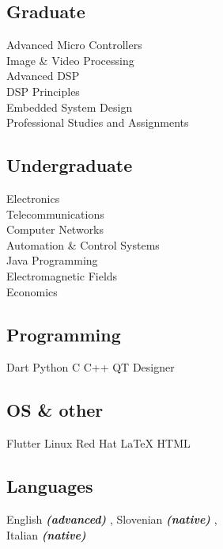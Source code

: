\documentclass[draft]{dske-resume-openfont}
\begin{document}
\begin{minipage}[t]{0.31\textwidth}
{\fontsize{\the\columnTextSize}{\the\columnLineSpace}\selectfont
\subsection{Graduate}
Advanced Micro Controllers \\
Image \& Video Processing\\
Advanced DSP \\
DSP Principles\\
Embedded System Design\\
Professional Studies and Assignments

\subsection{Undergraduate}
Electronics\\
Telecommunications \\
Computer Networks \\
Automation \& Control Systems \\
Java Programming \\
Electromagnetic Fields \\
Economics \\
}


{\fontsize{\the\columnTextSize}{\the\columnLineSpace}\selectfont

\subsection{Programming}
Dart \textbullet{} Python \textbullet{} C \textbullet{} C++ 
\textbullet{} QT Designer\\
\vspace{\subsectionspace}

\subsection{OS \& other}
Flutter \textbullet{} Linux Red Hat
\LaTeX \textbullet{} HTML\\ 
\vspace{\subsectionspace}

\subsection{Languages}
English {\footnotesize \textit{\textbf{(advanced) }}}, Slovenian {\footnotesize \textit{\textbf{(native) }}}, \\ Italian {\footnotesize \textit{\textbf{(native) }}}
\vspace{\subsectionspace}

}
\end{minipage}
\end{document}

